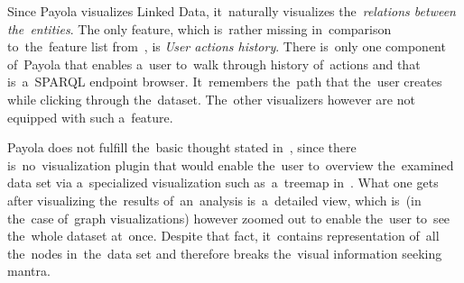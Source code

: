 Since Payola visualizes Linked Data, it~naturally visualizes the~\emph{relations between the~entities}.
The only feature, which is~rather missing in~comparison to~the~feature list from~\cite{mantra}, is
\emph{User actions history}.
There is~only one component of~Payola that enables a~user to~walk through 
history of~actions and that is~a~SPARQL endpoint browser. It~remembers the~path 
that the~user creates while clicking through the~dataset. The~other visualizers 
however are not equipped with such a~feature.

Payola does not fulfill the~basic thought stated in~\cite{mantra}, since 
there is~no~visualization plugin that would enable the~user to~overview the~examined data set via a~specialized visualization such as~a~treemap 
in~\cite{lodvis}. What one gets after visualizing the~results of~an~analysis is~a~detailed view, which is~(in the~case of~graph visualizations) however zoomed out
to enable the~user to~see the~whole dataset at~once. Despite that fact, it~contains representation of~all the~nodes in~the~data set and therefore breaks 
the~visual information seeking mantra.
